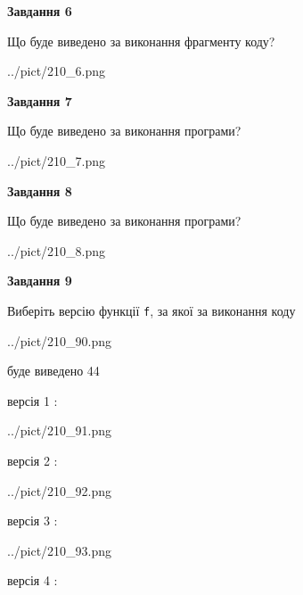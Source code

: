\documentclass[12pt, ukrainian]{article}
\def\code#1{\Verb!#1!}
\begin{document}
{\begin {large}
{\begin {center}\textbf{Завдання 6}\end {center}}

Що буде виведено за виконання фрагменту коду?\par
\begin{center}
	{../pict/210_6.png}
\end{center}
\newpage

{\begin {center}\textbf{Завдання 7}\end {center}}

Що буде виведено за виконання програми?\par
\begin{center}
	{../pict/210_7.png}
\end{center}
\newpage

{\begin {center}\textbf{Завдання 8}\end {center}}

Що буде виведено за виконання програми?\par
\begin{center}
	{../pict/210_8.png}
\end{center}
\newpage

{\begin {center}\textbf{Завдання 9}\end {center}}

Виберіть версію функції \code{f}, за якої за виконання коду
\begin{center}
	{../pict/210_90.png}
\end{center}
буде виведено 44

\vspace{5mm}
версія 1 :

\begin{center}
	{../pict/210_91.png}
\end{center}
версія 2 :

\begin{center}
	{../pict/210_92.png}
\end{center}
версія 3 :

\begin{center}
	{../pict/210_93.png}
\end{center}
версія 4 :


\end{large}}
\end{document}
